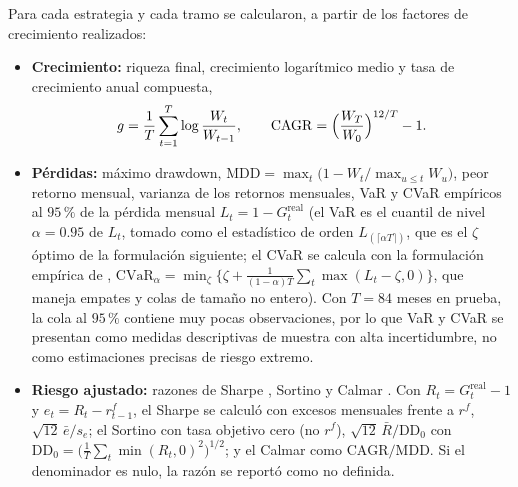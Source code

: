Para cada estrategia y cada tramo se calcularon, a partir de los factores de crecimiento realizados:
\begin{itemize}
    \item \textbf{Crecimiento:} riqueza final, crecimiento logarítmico medio y tasa de crecimiento anual compuesta,
    \begin{equation}\label{eq:metricas}
    g=\frac1T\sum_{t=1}^{T}\log\frac{W_t}{W_{t-1}},\qquad \mathrm{CAGR}=\Bigl(\frac{W_T}{W_0}\Bigr)^{12/T}-1 .
    \end{equation}
    \item \textbf{Pérdidas:} máximo drawdown, $\mathrm{MDD}=\max_t\bigl(1-W_t/\max_{u\le t}W_u\bigr)$, peor retorno mensual, varianza de los retornos mensuales, 
VaR y CVaR empíricos al $95\,\%$ de la pérdida mensual $L_t=1-G^{\mathrm{real}}_t$ (el VaR es el cuantil de nivel $\alpha=0.95$ de $L_t$, tomado como el estadístico de orden $L_{(\lceil\alpha T\rceil)}$, que es el $\zeta$ óptimo de la formulación siguiente; el CVaR se calcula con la formulación empírica de \citet{rockafellaruryasev2000}, $\mathrm{CVaR}_\alpha=\min_{\zeta}\bigl\{\zeta+\tfrac{1}{(1-\alpha)T}\sum_{t}\max(L_t-\zeta,0)\bigr\}$, que maneja empates y colas de tamaño no entero). Con $T=84$ meses en prueba, la cola al $95\,\%$ contiene muy pocas observaciones, por lo que VaR y CVaR se presentan como medidas descriptivas de muestra con alta incertidumbre, no como estimaciones precisas de riesgo extremo.

    \item \textbf{Riesgo ajustado:} 
razones de Sharpe \citep{sharpe1994}, Sortino \citep{sortinoprice1994} y Calmar \citep{young1991}. Con $R_t=G^{\mathrm{real}}_t-1$ y $e_t=R_t-r^f_{t-1}$, el Sharpe se calculó con excesos mensuales frente a $r^f$, $\sqrt{12}\,\bar e/s_e$; el Sortino con tasa objetivo cero (no $r^f$), $\sqrt{12}\,\bar R/\mathrm{DD}_0$ con $\mathrm{DD}_0=\bigl(\tfrac1T\sum_t\min(R_t,0)^2\bigr)^{1/2}$; y el Calmar como $\mathrm{CAGR}/\mathrm{MDD}$. Si el denominador es nulo, la razón se reportó como no definida.


\end{itemize}

